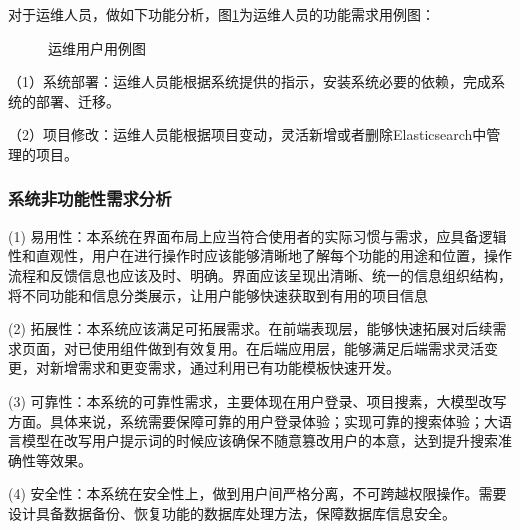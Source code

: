 \documentclass[UTF8,a4paper,12pt]{ctexart}
\numberwithin{equation}{section}
\begin{document}
对于运维人员，做如下功能分析，图\ref{operator}为运维人员的功能需求用例图：\par
\begin{figure}[H]
	\caption{运维用户用例图}
	\label{operator}
\end{figure}
（1）系统部署：运维人员能根据系统提供的指示，安装系统必要的依赖，完成系统的部署、迁移。\par
（2）项目修改：运维人员能根据项目变动，灵活新增或者删除Elasticsearch中管理的项目。\par
\subsubsection{系统非功能性需求分析}
(1)	易用性：本系统在界面布局上应当符合使用者的实际习惯与需求，应具备逻辑性和直观性，用户在进行操作时应该能够清晰地了解每个功能的用途和位置，操作流程和反馈信息也应该及时、明确。界面应该呈现出清晰、统一的信息组织结构，将不同功能和信息分类展示，让用户能够快速获取到有用的项目信息\par
(2)	拓展性：本系统应该满足可拓展需求。在前端表现层，能够快速拓展对后续需求页面，对已使用组件做到有效复用。在后端应用层，能够满足后端需求灵活变更，对新增需求和更变需求，通过利用已有功能模板快速开发。\par
(3)	可靠性：本系统的可靠性需求，主要体现在用户登录、项目搜素，大模型改写方面。具体来说，系统需要保障可靠的用户登录体验；实现可靠的搜索体验；大语言模型在改写用户提示词的时候应该确保不随意篡改用户的本意，达到提升搜索准确性等效果。\par
(4)	安全性：本系统在安全性上，做到用户间严格分离，不可跨越权限操作。需要设计具备数据备份、恢复功能的数据库处理方法，保障数据库信息安全。\par
\end{document}
